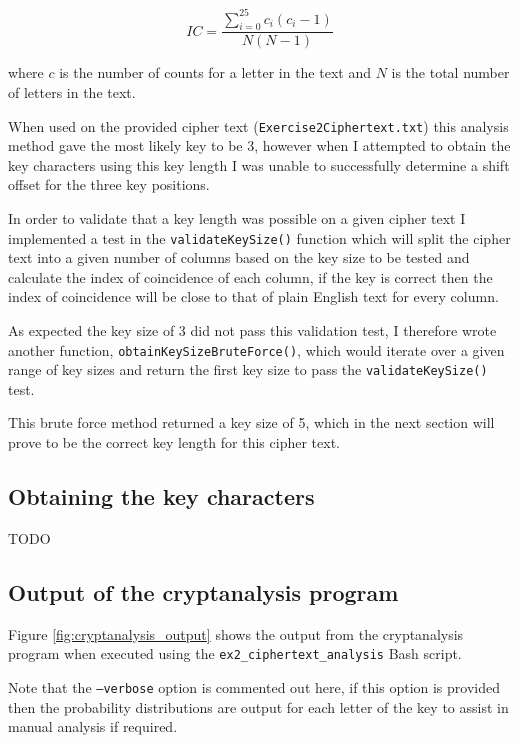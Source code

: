 \documentclass[a4paper]{article}
\begin{document}
\begin{equation}
  IC = \frac{\sum_{i = 0}^{25} c_{i} \left(c_{i} - 1\right)}{N \left(N - 1\right)}
  \label{eq:ioc}
\end{equation}
\FloatBarrier

where $c$ is the number of counts for a letter in the text and $N$ is the total
number of letters in the text.

When used on the provided cipher text (\texttt{Exercise2Ciphertext.txt}) this
analysis method gave the most likely key to be 3, however when I attempted to
obtain the key characters using this key length I was unable to successfully
determine a shift offset for the three key positions.

In order to validate that a key length was possible on a given cipher text I
implemented a test in the \texttt{validateKeySize()} function which will split
the cipher text into a given number of columns based on the key size to be
tested and calculate the index of coincidence of each column, if the key is
correct then the index of coincidence will be close to that of plain English
text for every column.

As expected the key size of 3 did not pass this validation test, I therefore
wrote another function, \texttt{obtainKeySizeBruteForce()}, which would iterate
over a given range of key sizes and return the first key size to pass the
\texttt{validateKeySize()} test.

This brute force method returned a key size of 5, which in the next section will
prove to be the correct key length for this cipher text.

\subsection{Obtaining the key characters}

TODO

\subsection{Output of the cryptanalysis program}
\label{sec:cryptanalysis_output}

Figure \ref{fig:cryptanalysis_output} shows the output from the cryptanalysis
program when executed using the \texttt{ex2\_ciphertext\_analysis} Bash script.

Note that the \texttt{--verbose} option is commented out here, if this option is
provided then the probability distributions are output for each letter of the
key to assist in manual analysis if required.
\end{document}

